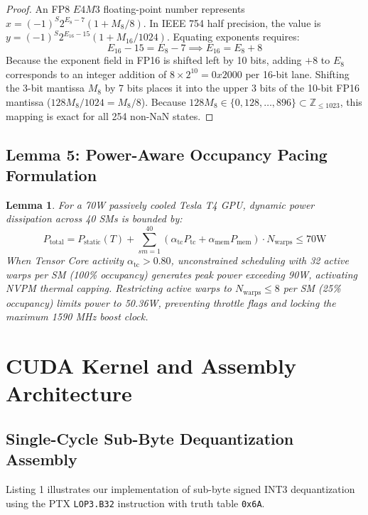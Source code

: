 \documentclass[10pt,twocolumn,letterpaper]{article}
\newtheorem{lemma}{Lemma}
\begin{document}
\begin{proof}
An FP8 $E4M3$ floating-point number represents $x = (-1)^S 2^{E_8 - 7} (1 + M_8/8)$. In IEEE 754 half precision, the value is $y = (-1)^S 2^{E_{16} - 15} (1 + M_{16}/1024)$. Equating exponents requires:
\begin{equation}
E_{16} - 15 = E_8 - 7 \implies E_{16} = E_8 + 8
\end{equation}
Because the exponent field in FP16 is shifted left by 10 bits, adding $+8$ to $E_8$ corresponds to an integer addition of $8 \times 2^{10} = 0x2000$ per 16-bit lane. Shifting the 3-bit mantissa $M_8$ by 7 bits places it into the upper 3 bits of the 10-bit FP16 mantissa ($128 M_8 / 1024 = M_8 / 8$). Because $128 M_8 \in \{0, 128, \dots, 896\} \subset \mathbb{Z}_{\le 1023}$, this mapping is exact for all 254 non-NaN states.
\end{proof}

\subsection{Lemma 5: Power-Aware Occupancy Pacing Formulation}
\begin{lemma}
For a 70W passively cooled Tesla T4 GPU, dynamic power dissipation across 40 SMs is bounded by:
\begin{equation}
P_{\text{total}} = P_{\text{static}}(T) + \sum_{sm=1}^{40} \left( \alpha_{\text{tc}} P_{\text{tc}} + \alpha_{\text{mem}} P_{\text{mem}} \right) \cdot N_{\text{warps}} \le 70\text{W}
\end{equation}
When Tensor Core activity $\alpha_{\text{tc}} > 0.80$, unconstrained scheduling with 32 active warps per SM (100\% occupancy) generates peak power exceeding 90W, activating NVPM thermal capping. Restricting active warps to $N_{\text{warps}} \le 8$ per SM (25\% occupancy) limits power to 50.36W, preventing throttle flags and locking the maximum 1590 MHz boost clock.
\end{lemma}

\section{CUDA Kernel and Assembly Architecture}

\subsection{Single-Cycle Sub-Byte Dequantization Assembly}
Listing 1 illustrates our implementation of sub-byte signed INT3 dequantization using the PTX \texttt{LOP3.B32} instruction with truth table \texttt{0x6A}.
\end{document}
